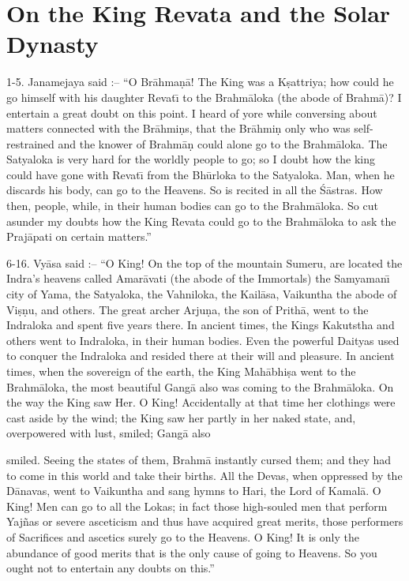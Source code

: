 \chapter{On the King Revata and the Solar Dynasty}

1-5. Janamejaya said :-- ``O Br\=ahma\d{n}\=a! The King was a K\d{s}attriya; how could he go himself with his daughter Revat\={\i} to the Brahm\=aloka (the abode of Brahm\=a)? I entertain a great doubt on this point. I heard of yore while conversing about matters connected with the Br\=ahmi\d{n}s, that the Br\=ahmi\d{n} only who was self-restrained and the knower of Brahm\=a\d{n} could alone go to the Brahm\=aloka. The Satyaloka is very hard for the worldly people to go; so I doubt how the king could have gone with Revat\={\i} from the Bh\=urloka to the Satyaloka. Man, when he discards his body, can go to the Heavens. So is recited in all the \'S\=astras. How then, people, while, in their human bodies can go to the Brahm\=aloka. So cut asunder my doubts how the King Revata could go to the Brahm\=aloka to ask the Praj\=apati on certain matters.''

6-16. Vy\=asa said :-- ``O King! On the top of the mountain Sumeru, are located the Indra's heavens called Amar\=avati (the abode of the Immortals) the Samyaman\={\i} city of Yama, the Satyaloka, the Vahniloka, the Kail\=asa, Vaikuntha the abode of Vi\d{s}\d{n}u, and others. The great archer Arju\d{n}a, the son of Prith\=a, went to the Indraloka and spent five years there. In ancient times, the Kings Kakutstha and others went to Indraloka, in their human bodies. Even the powerful Daityas used to conquer the Indraloka and resided there at their will and pleasure. In ancient times, when the sovereign of the earth, the King Mah\=abhi\d{s}a went to the Brahm\=aloka, the most beautiful Gang\=a also was coming to the Brahm\=aloka. On the way the King saw Her. O King! Accidentally at that time her clothings were cast aside by the wind; the King saw her partly in her naked state, and, overpowered with lust, smiled; Gang\=a also

smiled. Seeing the states of them, Brahm\=a instantly cursed them; and they had to come in this world and take their births. All the Devas, when oppressed by the D\=anavas, went to Vaikuntha and sang hymns to Hari, the Lord of Kamal\=a. O King! Men can go to all the Lokas; in fact those high-souled men that perform Yaj\~nas or severe asceticism and thus have acquired great merits, those performers of Sacrifices and ascetics surely go to the Heavens. O King! It is only the abundance of good merits that is the only cause of going to Heavens. So you ought not to entertain any doubts on this.''

